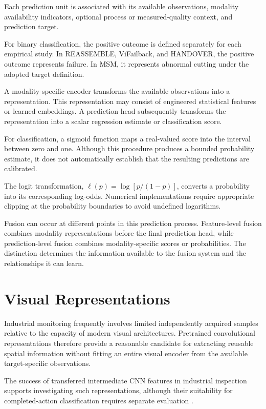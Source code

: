 Each prediction unit is associated with its available observations, modality availability indicators, optional process or measured-quality context, and prediction target.

For binary classification, the positive outcome is defined separately for each empirical study. In REASSEMBLE, ViFailback, and HANDOVER, the positive outcome represents failure. In MSM, it represents abnormal cutting under the adopted target definition.

A modality-specific encoder transforms the available observations into a representation. This representation may consist of engineered statistical features or learned embeddings. A prediction head subsequently transforms the representation into a scalar regression estimate or classification score.

For classification, a sigmoid function maps a real-valued score into the interval between zero and one. Although this procedure produces a bounded probability estimate, it does not automatically establish that the resulting predictions are calibrated.

The logit transformation, \(\ell(p)=\log[p/(1-p)]\), converts a probability into its corresponding log-odds. Numerical implementations require appropriate clipping at the probability boundaries to avoid undefined logarithms.

Fusion can occur at different points in this prediction process. Feature-level fusion combines modality representations before the final prediction head, while prediction-level fusion combines modality-specific scores or probabilities. The distinction determines the information available to the fusion system and the relationships it can learn.

\section{Visual Representations}

Industrial monitoring frequently involves limited independently acquired samples relative to the capacity of modern visual architectures. Pretrained convolutional representations therefore provide a reasonable candidate for extracting reusable spatial information without fitting an entire visual encoder from the available target-specific observations.

The success of transferred intermediate CNN features in industrial inspection supports investigating such representations, although their suitability for completed-action classification requires separate evaluation \parencite{Roth2022Towards}.

